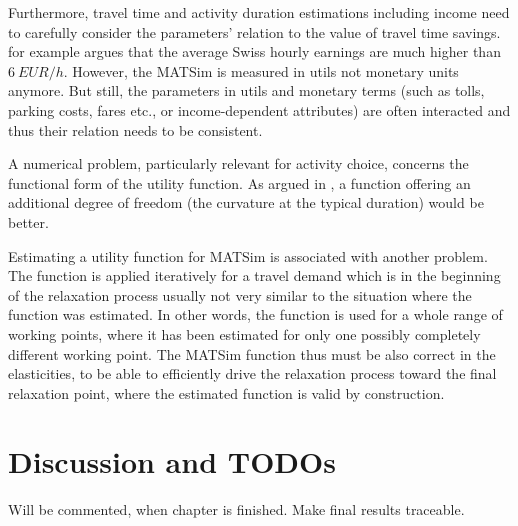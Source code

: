 Furthermore, travel time and activity duration estimations including income need to carefully consider the parameters' relation to the value of travel time savings. \citet[][p.276]{MeisterEtAl_SVT_2009} for example argues that the average Swiss hourly earnings are much higher than $6\ EUR/h$. However, the MATSim is measured in utils not monetary units anymore. But still, the parameters in utils and monetary terms (such as tolls, parking costs, fares etc., or income-dependent attributes) are often interacted and thus their relation needs to be consistent.

A numerical problem, particularly relevant for activity choice, concerns the functional form of the utility function. As argued in \citet[][p.33]{MATSim_Userguide_2014}, a function offering an additional degree of freedom (the curvature at the typical duration) would be better.

Estimating a utility function for MATSim is associated with another problem. The function is applied iteratively for a travel demand which is in the beginning of the relaxation process usually not very similar to the situation where the function was estimated. In other words, the function is used for a whole range of working points, where it has been estimated for only one  possibly completely different working point. The MATSim function thus must be also correct in the elasticities, to be able to efficiently drive the relaxation process toward the final relaxation point, where the estimated function is valid by construction. 

\section{Discussion and TODOs}
\label{sec:discussion_scoring}
Will be commented, when chapter is finished. Make final results traceable.


